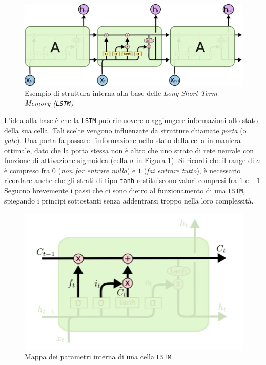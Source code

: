 \documentclass[twoside,twocolumn,11pt]{extarticle}
\theoremstyle{definition}
\begin{document}
		\begin{figure}[h]
			\centering
			\includegraphics[scale=.5]{img/lstm.png}
			\caption{Esempio di struttura interna alla base delle \textit{Long Short Term Memory (\texttt{LSTM})}}
			\label{fig:lstm}
		\end{figure}
	
		L'idea alla base è che la \texttt{LSTM} può rimuovere o aggiungere informazioni allo stato della sua cella. Tali scelte vengono influenzate da strutture chiamate \textit{porta} (o \textit{gate}). Una porta fa passare l'informazione nello stato della cella in maniera ottimale, dato che la porta stessa non è altro che uno strato di rete neurale con funzione di attivazione sigmoidea (cella $\sigma$ in Figura \ref{fig:lstm}). Si ricordi che il range di $\sigma$ è compreso fra $0$ (\textit{non far entrare nulla}) e $1$ (\textit{fai entrare tutto}), è necessario ricordare anche che gli strati di tipo \texttt{tanh} restituiscono valori compresi fra $1$ e $-1$. Seguono brevemente i passi che ci sono dietro al funzionamento di una \texttt{LSTM}, spiegando i principi sottostanti senza addentrarsi troppo nella loro complessità.
		\begin{figure}[ht!]
			\centering
			\caption{Mappa dei parametri interna di una cella \texttt{LSTM}}
			\includegraphics[scale=.8]{img/inside-lstm.png}
		\end{figure}
		
\end{document}
